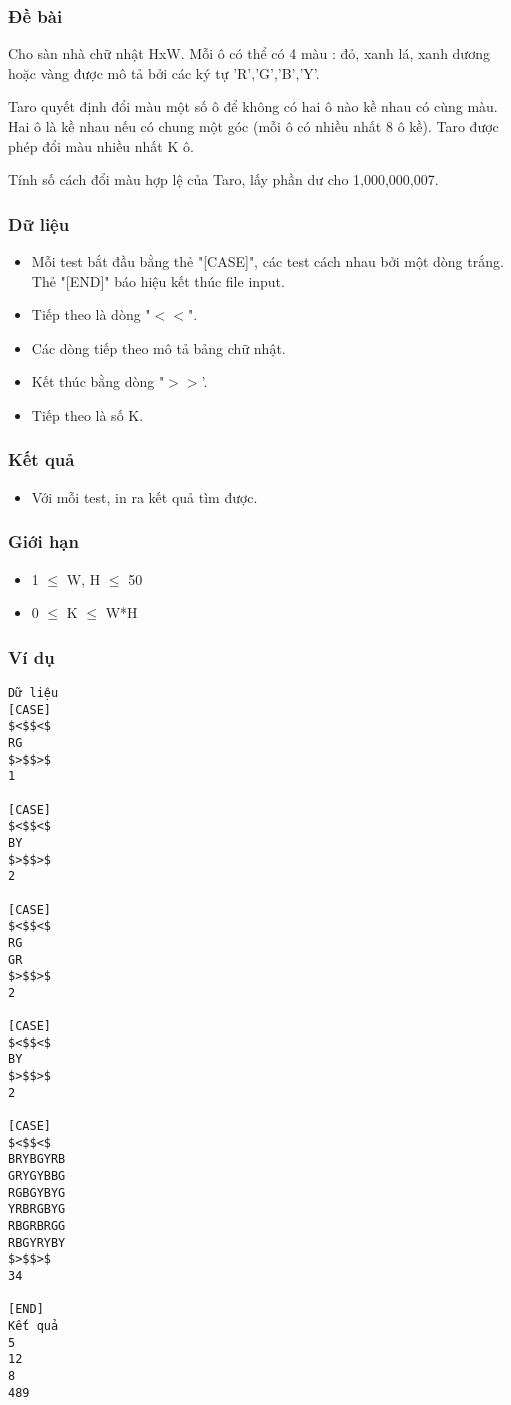 



\subsubsection{   Đề bài  }

   Cho sàn nhà chữ nhật HxW. Mỗi ô có thể có 4 màu : đỏ, xanh lá, xanh dương hoặc vàng được mô tả bởi các ký tự 'R','G','B','Y'.  

   Taro quyết định đổi màu một số ô để không có hai ô nào kề nhau có cùng màu. Hai ô là kề nhau nếu có chung một góc (mỗi ô có nhiều nhất 8 ô kề). Taro được phép đổi màu nhiều nhất K ô.  

   Tính số cách đổi màu hợp lệ của Taro, lấy phần dư cho 1,000,000,007.  

\subsubsection{   Dữ liệu  }
\begin{itemize}
	\item     Mỗi test bắt đầu bằng thẻ "[CASE]", các test cách nhau bởi một dòng trắng. Thẻ "[END]" báo hiệu kết thúc file input.   
	\item     Tiếp theo là dòng "$<$$<$".   
	\item     Các dòng tiếp theo mô tả bảng chữ nhật.   
	\item     Kết thúc bằng dòng "$>$$>$'.   
	\item     Tiếp theo là số K.   
\end{itemize}

\subsubsection{   Kết quả  }
\begin{itemize}
	\item     Với mỗi test, in ra kết quả tìm được.   
\end{itemize}

\subsubsection{   Giới hạn  }
\begin{itemize}
	\item     1  $\le$  W, H  $\le$  50   
	\item     0  $\le$  K  $\le$  W*H   
\end{itemize}

\subsubsection{   Ví dụ  }
\begin{verbatim}
Dữ liệu
[CASE]
$<$$<$
RG
$>$$>$
1

[CASE]
$<$$<$
BY
$>$$>$
2

[CASE]
$<$$<$
RG
GR
$>$$>$
2

[CASE]
$<$$<$
BY
$>$$>$
2

[CASE]
$<$$<$ 	
BRYBGYRB
GRYGYBBG
RGBGYBYG
YRBRGBYG
RBGRBRGG
RBGYRYBY
$>$$>$
34

[END]
Kết quả
5
12
8
489
\end{verbatim}
